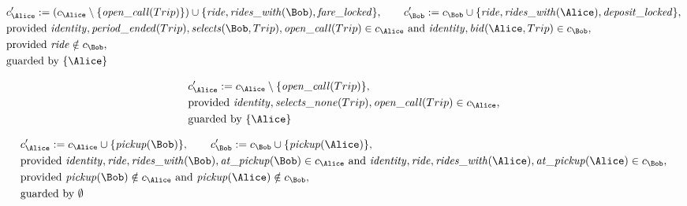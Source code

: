 \begin{align*}
&
c'_
{
\Alice
}
 := 
(c_
{
\Alice
}
 \setminus 
\{
\mathit{\detokenize{
open_call
}}
(
Trip
)
\}
) \cup 
\{
\mathit{\detokenize{
ride
}}
,
\mathit{\detokenize{
rides_with
}}
(
\Bob
)
,
\mathit{\detokenize{
fare_locked
}}
\}
, \qquad 
c'_
{
\Bob
}
 := 
c_
{
\Bob
}
 \cup 
\{
\mathit{\detokenize{
ride
}}
,
\mathit{\detokenize{
rides_with
}}
(
\Alice
)
,
\mathit{\detokenize{
deposit_locked
}}
\}
,\\
&
\text{provided } 
\mathit{\detokenize{
identity
}}
,
\mathit{\detokenize{
period_ended
}}
(
Trip
)
,
\mathit{\detokenize{
selects
}}
(
\Bob
,
Trip
)
,
\mathit{\detokenize{
open_call
}}
(
Trip
)
 \in c_
{
\Alice
}
 \text{ and } 
\mathit{\detokenize{
identity
}}
,
\mathit{\detokenize{
bid
}}
(
\Alice
,
Trip
)
 \in c_
{
\Bob
}
,\\
&
\text{provided } 
\mathit{\detokenize{
ride
}}
 \notin c_
{
\Bob
}
,\\
&
\text{guarded by } \{
\Alice
\}
\end{align*}

\begin{align*}
&
c'_
{
\Alice
}
 := 
c_
{
\Alice
}
 \setminus 
\{
\mathit{\detokenize{
open_call
}}
(
Trip
)
\}
,\\
&
\text{provided } 
\mathit{\detokenize{
identity
}}
,
\mathit{\detokenize{
selects_none
}}
(
Trip
)
,
\mathit{\detokenize{
open_call
}}
(
Trip
)
 \in c_
{
\Alice
}
,\\
&
\text{guarded by } \{
\Alice
\}
\end{align*}

\begin{align*}
&
c'_
{
\Alice
}
 := 
c_
{
\Alice
}
 \cup 
\{
\mathit{\detokenize{
pickup
}}
(
\Bob
)
\}
, \qquad 
c'_
{
\Bob
}
 := 
c_
{
\Bob
}
 \cup 
\{
\mathit{\detokenize{
pickup
}}
(
\Alice
)
\}
,\\
&
\text{provided } 
\mathit{\detokenize{
identity
}}
,
\mathit{\detokenize{
ride
}}
,
\mathit{\detokenize{
rides_with
}}
(
\Bob
)
,
\mathit{\detokenize{
at_pickup
}}
(
\Bob
)
 \in c_
{
\Alice
}
 \text{ and } 
\mathit{\detokenize{
identity
}}
,
\mathit{\detokenize{
ride
}}
,
\mathit{\detokenize{
rides_with
}}
(
\Alice
)
,
\mathit{\detokenize{
at_pickup
}}
(
\Alice
)
 \in c_
{
\Bob
}
,\\
&
\text{provided } 
\mathit{\detokenize{
pickup
}}
(
\Bob
)
 \notin c_
{
\Alice
}
 \text{ and } 
\mathit{\detokenize{
pickup
}}
(
\Alice
)
 \notin c_
{
\Bob
}
,\\
&
\text{guarded by } \emptyset
\end{align*}
